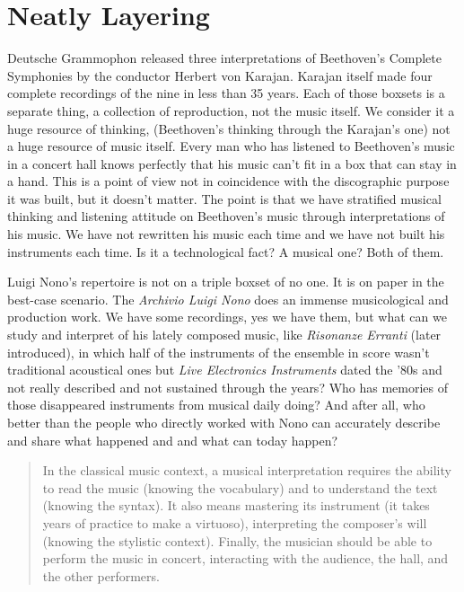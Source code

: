 \documentclass[twoside,a4paper]{article}
\begin{document}
\section{Neatly Layering}
\label{sec:layering}

Deutsche Grammophon released three interpretations of Beethoven's Complete Symphonies by the conductor Herbert von Karajan. Karajan itself made four complete recordings of the nine in less than 35 years\cite{rrrnyt}. Each of those boxsets is a separate thing, a collection of reproduction, not the music itself. We consider it a huge resource of thinking, (Beethoven's thinking through the Karajan's one) not a huge resource of music itself. Every man who has listened to Beethoven's music in a concert hall knows perfectly that his music can't fit in a box that can stay in a hand. This is a point of view not in coincidence with the discographic purpose it was built, but it doesn't matter. The point is that we have stratified musical thinking and listening attitude on Beethoven's music through interpretations of his music. We have not rewritten his music each time and we have not built his instruments each time. Is it a technological fact? A musical one? Both of them.

Luigi Nono's repertoire is not on a triple boxset of no one. It is on paper in the best-case scenario. The \emph{Archivio Luigi Nono} does an immense musicological and production work. We have some recordings, yes we have them, but what can we study and interpret of his lately composed music, like \emph{Risonanze Erranti} (later introduced), in which half of the instruments of the ensemble in score wasn't traditional acoustical ones but \emph{Live Electronics Instruments} dated the '80s and not really described and not sustained through the years? Who has memories of those disappeared instruments from musical daily doing? And after all, who better than the people who directly worked with Nono can accurately describe and share what happened and and what can today happen?

\begin{quote}
In the classical music context, a musical interpretation requires the ability to read the music (knowing the vocabulary) and to understand the text (knowing the syntax). It also means mastering its instrument (it takes years of practice to make a virtuoso), interpreting the composer’s will (knowing the stylistic context). Finally, the musician should be able to perform the music in concert, interacting with the audience, the hall, and the other performers\cite{lem16}.
\end{quote}
\end{document}
